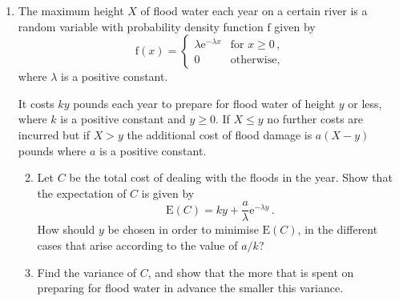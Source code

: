 \documentclass[a4, 11pt]{report}
\newlength{\qspace}
\newcounter{qnumber}
\newenvironment{question}%
 {\vspace{\qspace}
  \begin{enumerate}[\bfseries 1\quad][10]%
    \setcounter{enumi}{\value{qnumber}}%
    \item%
 }
{
  \end{enumerate}
  \filbreak
  \stepcounter{qnumber}
 }
\newenvironment{questionparts}[1][1]%
 {
  \begin{enumerate}[\bfseries (i)]%
    \setcounter{enumii}{#1}
    \addtocounter{enumii}{-1}
    \setlength{\itemsep}{5mm}
    \setlength{\parskip}{8pt}
 }
 {
  \end{enumerate}
 }
\def\e{{\mathrm e}}
\def\f{{\mathrm f}}
\def\le{\leqslant}
\def\ge{\geqslant}
\renewcommand{\.}[1]{\ensuremath{\mathrm{#1}}}
\newcommand{\+}[1]{\ensuremath{\mathbf{#1}}}
\begin{document}
\begin{question}
The maximum height $X$ of flood water each year on a certain river is a random variable with probability density function $\f$ given by
\[
\f(x) = \begin{cases}
\lambda \e^{-\lambda x} & \text{for $x\ge0$}\,, \\

0 & \text{otherwise,}
\end{cases}
\]
where $\lambda$ is a positive constant.

It costs $ky$ pounds each year to prepare for flood water of height $y$ or less, where $k$ is a positive constant and $y\ge0$.  If $X \le y$ no further costs are incurred but if $X> y$ the additional cost of flood damage is  $a(X - y )$ pounds where $a$ is a positive constant. 

\begin{questionparts}
\item Let $C$ be the total cost of dealing with the floods in the year. Show that the expectation of $C$ is given by 
\[\mathrm{E}(C)=ky+\frac{a}{\lambda}\mathrm{e}^{-\lambda y} \, .
\]
How should $y$ be chosen in order to minimise $\mathrm{E}(C)$, in the different cases that arise according to the value of $a/k$?

\item Find  the variance of $C$,  and show that the more that is spent on preparing for flood water in advance the smaller this variance.

\end{questionparts}
\end{question}
\end{document}

